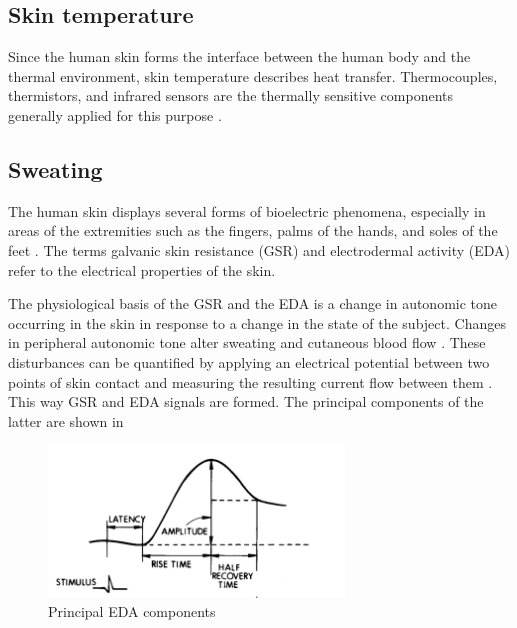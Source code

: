 \subsection{Skin temperature}
\label{subsec:setup:phys-signals:temp}

Since the human skin forms the interface between the human body and the thermal environment, skin temperature describes heat transfer. Thermocouples, thermistors, and infrared sensors are the thermally sensitive components generally applied for this purpose  \cite{van2006evaluation}.


\subsection{Sweating}
\label{subsec:setup:phys-signals:eda}

The human skin displays several forms of bioelectric phenomena, especially in areas of the extremities such as the fingers, palms of the hands, and soles of the feet \cite{PoligraphLesson}. The terms galvanic skin resistance (GSR) and electrodermal activity (EDA) refer to the electrical properties of the skin.


The physiological basis of the GSR and the EDA is a change in autonomic tone occurring in the skin in response to a change in the state of the subject. Changes in peripheral autonomic tone alter sweating and cutaneous blood flow \cite{PoligraphLesson}. These disturbances can be quantified by applying an electrical potential between two points of skin contact and measuring the resulting current flow between them \cite{braithwaite2013guide}. This way GSR and EDA signals are formed. The principal components of the latter are shown in 

\begin{figure}[!ht]
\centering
\includegraphics[width=0.7\textwidth]{images/EDAcomponents.png}
\caption{Principal EDA components}
\label{fig:EDAcomponents}
\end{figure}
